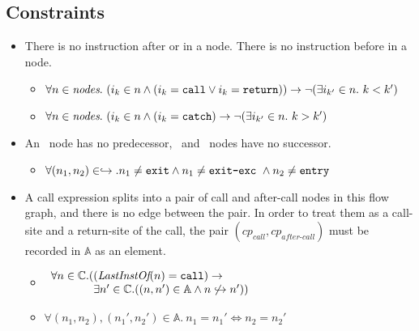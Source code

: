 \subsection{Constraints}
\begin{itemize}
\item There is no instruction after  or  in a node. There is no instruction before  in a node.
    \begin{itemize}
    \item $\forall n \in \emph{nodes}.\ (i_k\in n \wedge (i_k = \mbox{\texttt{call}} \vee i_k =\mbox{\texttt{return}}))\rightarrow \neg(\exists i_{k'} \in n.\ k<k')$
    \item $\forall n \in \emph{nodes}.\ (i_k\in n \wedge (i_k =\TT{catch})\rightarrow \neg(\exists i_{k'} \in n.\ k>k')$
    \end{itemize}
\item An \Entry\ node has no predecessor, \Exit\ and \Exite\ nodes have no successor.
    \begin{itemize}
    \item $\forall (n_1,n_2)\in \hookrightarrow. n_1 \neq \mbox{\texttt{exit}} \wedge n_1 \neq \mbox{\texttt{exit-exc}}~ \wedge  n_2 \neq \mbox{\texttt{entry}} $

    \end{itemize}

\item A call expression splits into a pair of call and after-call nodes in this flow graph, and there is no edge between the pair. In order to treat them as a call-site and a return-site of the call, the pair $(cp_{\textit{call}},cp_{\textit{after-call}})$ must be recorded in $\mathbb{A}$ as an element.
   \begin{itemize}
	\item $
\begin{array}{ll}
\forall n \in \controlpoint.( (\emph{LastInstOf}(n) = \TT{call}) \rightarrow\\
\phantom{\forall n \in \controlpoint.(}
 \exists n' \in \controlpoint.((n,n')\in \mathbb{A} \wedge n\not\cfgnext n'))
\end{array}
$

	\item $\forall(n_1,n_2),(n_1',n_2')\in \mathbb{A}. \ n_1 = n_1' \Leftrightarrow n_2 = n_2' $
    \end{itemize}
\end{itemize}


